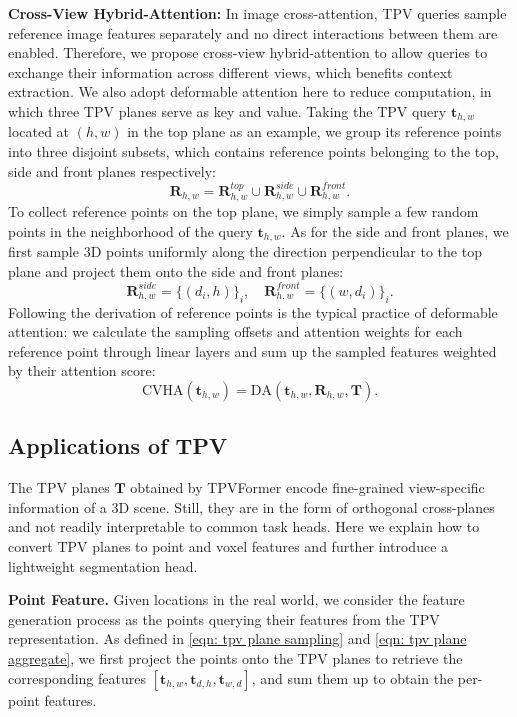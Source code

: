 \documentclass[10pt,twocolumn,letterpaper]{article}
\begin{document}
\textbf{Cross-View Hybrid-Attention:}
In image cross-attention, TPV queries sample reference image features separately and no direct interactions between them are enabled.
Therefore, we propose cross-view hybrid-attention to allow queries to exchange their information across different views, which benefits context extraction.
We also adopt deformable attention here to reduce computation, in which three TPV planes serve as key and value.
Taking the TPV query $\mathbf{t}_{h,w}$ located at $(h,w)$ in the top plane as an example, we group its reference points into three disjoint subsets, which contains reference points belonging to the top, side and front planes respectively:
\begin{equation}
    \mathbf{R}_{h,w} = \mathbf{R}_{h,w}^{top} \cup \mathbf{R}_{h,w}^{side} \cup \mathbf{R}_{h,w}^{front}.
\end{equation}
To collect reference points on the top plane, we simply sample a few random points in the neighborhood of the query $\mathbf{t}_{h,w}$.
As for the side and front planes, we first sample 3D points uniformly along the direction perpendicular to the top plane and project them onto the side and front planes:
\begin{equation}
    \mathbf{R}_{h,w}^{side} = \{(d_{i}, h)\}_{i}, \quad \mathbf{R}_{h,w}^{front} = \{(w, d_{i})\}_{i}.
\end{equation}
Following the derivation of reference points is the typical practice of deformable attention: we calculate the sampling offsets and attention weights for each reference point through linear layers and sum up the sampled features weighted by their attention score:
\begin{equation}
    \mathrm{CVHA}(\mathbf{t}_{h,w})=\mathrm{DA}(\mathbf{t}_{h,w}, \mathbf{R}_{h,w}, \mathbf{T}).
\end{equation}



\subsection{Applications of TPV}\label{subsec: app}
The TPV planes $\mathbf{T}$ obtained by TPVFormer encode fine-grained view-specific information of a 3D scene.
Still, they are in the form of orthogonal cross-planes and not readily interpretable to common task heads.
Here we explain how to convert TPV planes to point and voxel features and further introduce a lightweight segmentation head.

\textbf{Point Feature.}
Given locations in the real world, we consider the feature generation process as the points querying their features from the TPV representation.
As defined in \eqref{eqn: tpv plane sampling} and \eqref{eqn: tpv plane aggregate}, we first project the points onto the TPV planes to retrieve the corresponding features $[\mathbf{t}_{h,w},\mathbf{t}_{d,h},\mathbf{t}_{w,d}]$, and sum them up to obtain the per-point features.
\end{document}
